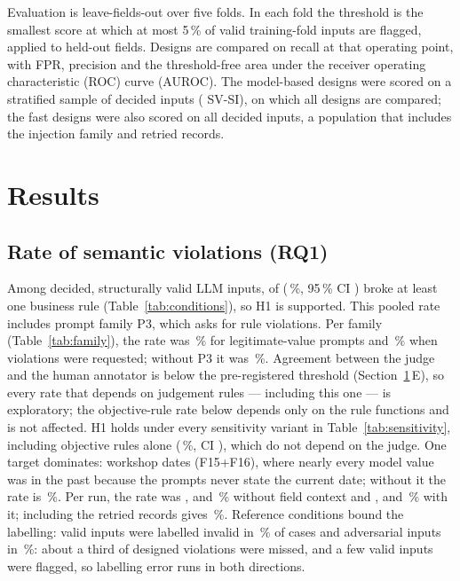 \documentclass[conference]{IEEEtran}
\begin{document}
Evaluation is leave-fields-out over five folds. In each fold the threshold is the smallest score at
which at most 5\,\% of valid training-fold inputs are flagged, applied to held-out fields. Designs are
compared on recall at that operating point, with FPR, precision and the threshold-free area under the
receiver operating characteristic (ROC) curve (AUROC). The model-based designs were scored on a stratified sample of  decided
inputs ( SV-SI), on which all designs are compared; the fast designs were also scored on
all  decided inputs, a population that includes the injection family and retried records.

\section{Results}
\label{sec:results}

\subsection{Rate of semantic violations (RQ1)}

Among decided, structurally valid LLM inputs,  of  (\,\%, 95\,\% CI
) broke at least one business rule (Table~\ref{tab:conditions}), so H1 is supported. This
pooled rate includes prompt family P3, which asks for rule violations. Per family
(Table~\ref{tab:family}), the rate was \,\% for legitimate-value prompts and
\,\% when violations were requested; without P3 it was \,\%. \ifjudgeweak Agreement between the judge and the human annotator is below the pre-registered
threshold (Section~\ref{sec:results}\,E), so every rate that depends on judgement rules --- including
this one --- is exploratory; the objective-rule rate below depends only on the rule functions and is
not affected.\fi{} H1 holds
under every sensitivity variant in Table~\ref{tab:sensitivity}, including objective rules alone
(\,\%, CI ), which do not depend on the judge. One target
dominates: workshop dates (F15+F16), where nearly every model value was in the past because the
prompts never state the current date; without it the rate is \,\%. Per run, the rate
was ,  and \,\% without field context and ,
 and \,\% with it; including the retried records gives \,\%.
Reference conditions bound the labelling: valid inputs were labelled invalid in \,\% of
cases and adversarial inputs in \,\%: about a third of designed violations were missed,
and a few valid inputs were flagged, so labelling error runs in both directions.
\end{document}
